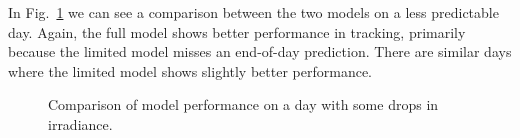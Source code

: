 In Fig.~\ref{fig:disc_med} we can see a comparison between the two models on a less predictable day. Again, the full model shows better performance in tracking, primarily because the limited model misses an end-of-day prediction. There are similar days where the limited model shows slightly better performance.
\begin{figure}[ht!]
    \centering
    \qquad
    \qquad
    \caption{Comparison of model performance on a day with some drops in irradiance.
    \label{fig:disc_med}}
\end{figure}

